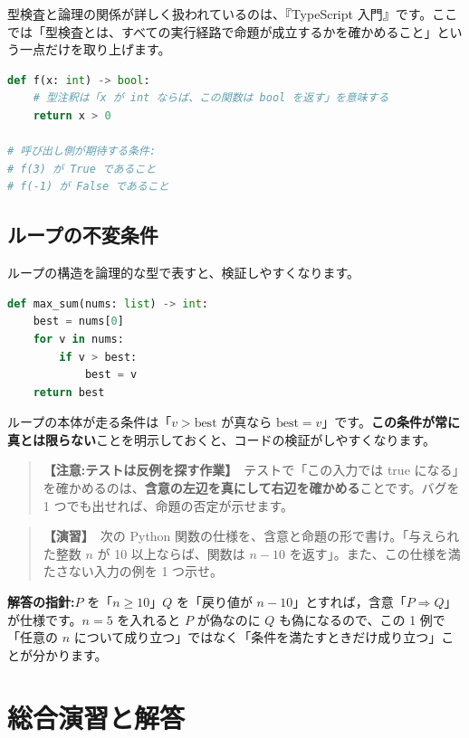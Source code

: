 \documentclass{article}
\begin{document}
型検査と論理の関係が詳しく扱われているのは、『TypeScript 入門』です。ここでは「型検査とは、すべての実行経路で命題が成立するかを確かめること」という一点だけを取り上げます。

\begin{lstlisting}[language=Python]
def f(x: int) -> bool:
    # 型注釈は「x が int ならば、この関数は bool を返す」を意味する
    return x > 0

# 呼び出し側が期待する条件:
# f(3) が True であること
# f(-1) が False であること
\end{lstlisting}

\subsection{ループの不変条件}

ループの構造を論理的な型で表すと、検証しやすくなります。

\begin{lstlisting}[language=Python]
def max_sum(nums: list) -> int:
    best = nums[0]
    for v in nums:
        if v > best:
            best = v
    return best
\end{lstlisting}

ループの本体が走る条件は「\(v > \text{best}\) が真なら \(\text{best} = v\)」です。\textbf{この条件が常に真とは限らない}ことを明示しておくと、コードの検証がしやすくなります。

\begin{quote}
\textbf{【注意:テストは反例を探す作業】}\ テストで「この入力では true になる」を確かめるのは、\textbf{含意の左辺を真にして右辺を確かめる}ことです。バグを 1 つでも出せれば、命題の否定が示せます。
\end{quote}

\begin{quote}
\textbf{【演習】}\ 次の Python 関数の仕様を、含意と命題の形で書け。「与えられた整数 \(n\) が 10 以上ならば、関数は \(n - 10\) を返す」。また、この仕様を満たさない入力の例を 1 つ示せ。
\end{quote}

\textbf{解答の指針:}\(P\) を「\(n \ge 10\)」\(Q\) を「戻り値が \(n - 10\)」とすれば，含意「\(P \Rightarrow Q\)」が仕様です。\(n = 5\) を入れると \(P\) が偽なのに \(Q\) も偽になるので、この 1 例で「任意の \(n\) について成り立つ」ではなく「条件を満たすときだけ成り立つ」ことが分かります。

\section{総合演習と解答}
\end{document}
